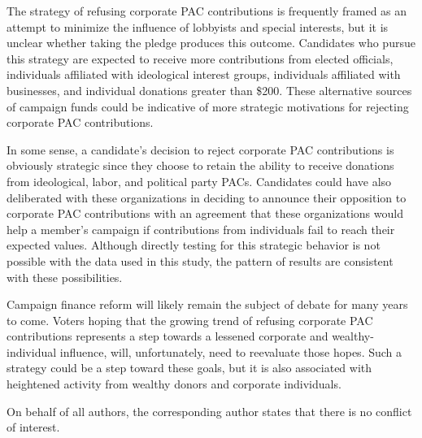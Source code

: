 \documentclass[12pt]{article}
\begin{document}
The strategy of refusing corporate PAC contributions is frequently framed as an attempt to minimize the influence of lobbyists and special interests, but it is unclear whether taking the pledge produces this outcome. Candidates who pursue this strategy are expected to receive more contributions from elected officials, individuals affiliated with ideological interest groups, individuals affiliated with businesses, and individual donations greater than \$200. These alternative sources of campaign funds could be indicative of more strategic motivations for rejecting corporate PAC contributions. 

In some sense, a candidate's decision to reject corporate PAC contributions is obviously strategic since they choose to retain the ability to receive donations from ideological, labor, and political party PACs. Candidates could have also deliberated with these organizations in deciding to announce their opposition to corporate PAC contributions with an agreement that these organizations would help a member's campaign if contributions from individuals fail to reach their expected values. Although directly testing for this strategic behavior is not possible with the data used in this study, the pattern of results are consistent with these possibilities.
 
 Campaign finance reform will likely remain the subject of debate for many years to come. Voters hoping that the growing trend of refusing corporate PAC contributions represents a step towards a lessened corporate and wealthy-individual influence, will, unfortunately, need to reevaluate those hopes. Such a strategy could be a step toward these goals, but it is also associated with heightened activity from wealthy donors and corporate individuals.  


\pagebreak

On behalf of all authors, the corresponding author states that there is no conflict of interest.

\pagebreak

\singlespacing
{}
%
\printbibliography
\pagebreak
\end{document}
